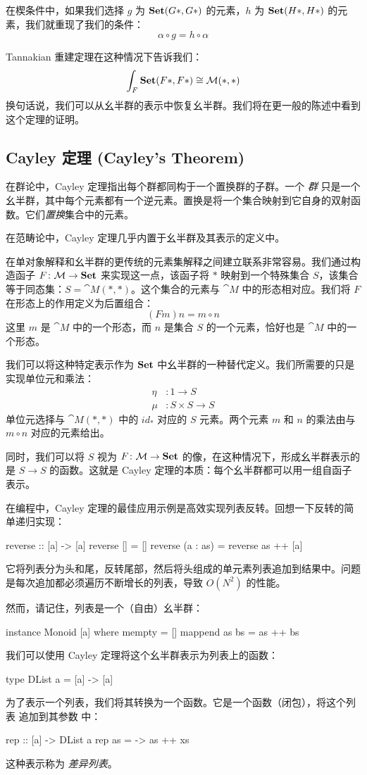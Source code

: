 \documentclass[DaoFP]{subfiles}
\begin{document}
 在楔条件中，如果我们选择 $g$ 为 $\mathbf{Set} (G*, G*)$ 的元素，$h$ 为 $\mathbf{Set} (H*, H*)$ 的元素，我们就重现了我们的条件：
 \[ \alpha \circ g = h \circ \alpha \]

 Tannakian 重建定理在这种情况下告诉我们：
 \[ \int_F \mathbf{Set}(F *, F *) \cong \mathcal{M} (*, *) \]
 换句话说，我们可以从幺半群的表示中恢复幺半群。我们将在更一般的陈述中看到这个定理的证明。

 \subsection{Cayley 定理 (Cayley's Theorem)}

 在群论中，Cayley 定理指出每个群都同构于一个置换群的子群。一个 \emph{群} 只是一个幺半群，其中每个元素都有一个逆元素。置换是将一个集合映射到它自身的双射函数。它们\emph{置换}集合中的元素。

 在范畴论中，Cayley 定理几乎内置于幺半群及其表示的定义中。

 在单对象解释和幺半群的更传统的元素集解释之间建立联系非常容易。我们通过构造函子 $F \colon \mathcal{M} \to \mathbf{Set}$ 来实现这一点，该函子将 $*$ 映射到一个特殊集合 $S$，该集合等于同态集：$S = \cat M(*, *)$。这个集合的元素与 $\cat M$ 中的形态相对应。我们将 $F$ 在形态上的作用定义为后置组合：
 \[ (F m) n = m \circ n \]
 这里 $m$ 是 $\cat M$ 中的一个形态，而 $n$ 是集合 $S$ 的一个元素，恰好也是 $\cat M$ 中的一个形态。

 我们可以将这种特定表示作为 $\mathbf{Set}$ 中幺半群的一种替代定义。我们所需要的只是实现单位元和乘法：
 \begin{align*}
  \eta &\colon 1 \to S \\
  \mu &\colon S \times S \to S
 \end{align*}
 单位元选择与 $\cat M(*, *)$ 中的 $id_*$ 对应的 $S$ 元素。两个元素 $m$ 和 $n$ 的乘法由与 $m \circ n$ 对应的元素给出。

 同时，我们可以将 $S$ 视为 $F \colon \mathcal{M} \to \mathbf{Set}$ 的像，在这种情况下，形成幺半群表示的是 $S \to S$ 的函数。这就是 Cayley 定理的本质：每个幺半群都可以用一组自函子表示。

 在编程中，Cayley 定理的最佳应用示例是高效实现列表反转。回想一下反转的简单递归实现：
 \begin{haskell}
  reverse :: [a] -> [a]
  reverse [] = []
  reverse (a : as) = reverse as ++ [a]
 \end{haskell}
 它将列表分为头和尾，反转尾部，然后将头组成的单元素列表追加到结果中。问题是每次追加都必须遍历不断增长的列表，导致 $O(N^2)$ 的性能。

 然而，请记住，列表是一个（自由）幺半群：
 \begin{haskell}
  instance Monoid [a] where
  mempty = []
  mappend as bs = as ++ bs
 \end{haskell}
 我们可以使用 Cayley 定理将这个幺半群表示为列表上的函数：
 \begin{haskell}
  type DList a = [a] -> [a]
 \end{haskell}
 为了表示一个列表，我们将其转换为一个函数。它是一个函数（闭包），将这个列表  追加到其参数  中：
 \begin{haskell}
  rep :: [a] -> DList a
  rep as = \xs -> as ++ xs
 \end{haskell}
 这种表示称为 \emph{差异列表}。
\end{document}
